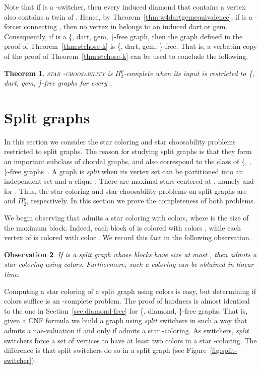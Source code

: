 \documentclass[a4paper, 11pt, oneside]{article}
\newtheorem{theorem}{Theorem}
\newtheorem{observation}[theorem]{Observation}
\newcommand{\stchose}[1]{\textsc{star -choosability}}
\newcommand{\ptwop}{\ensuremath{\Pi^p_2}\xspace}
\let\Definition=\emph
\begin{document}
Note that if  is a -switcher, then every induced diamond that contains a vertex  also contains a twin of .  Hence, by Theorem~\ref{thm:w4dartgemequivalence}, if  is a -forcer connecting , then no vertex in  belongs to an induced dart or gem.  Consequently, if  is a \{, dart, gem, \}-free graph, then the graph  defined in the proof of Theorem~\ref{thm:stchose-k} is \{, dart, gem, \}-free.  That is, a verbatim copy of the proof of Theorem~\ref{thm:stchose-k} can be used to conclude the following.

\begin{theorem}
  \stchose{k} is \ptwop-complete when its input is restricted to \{, dart, gem, \}-free graphs for every .
\end{theorem}

\section{Split graphs}
\label{sec:split}

In this section we consider the star coloring and star choosability problems restricted to split graphs.  The reason for studying split graphs is that they form an important subclass of chordal graphs, and also correspond to the class of \{, , \}-free graphs~\cite{Golumbic2004}.  A graph  is \Definition{split} when its vertex set can be partitioned into an independent set  and a clique .  There are  maximal stars centered at , namely  and  for .  Thus, the star coloring and star choosability problems on split graphs are \NP and \ptwop, respectively.  In this section we prove the completeness of both problems.

We begin observing that  admits a star coloring with  colors, where  is the size of the maximum block.  Indeed, each block  of  is colored with colors , while each vertex of  is colored with color .  We record this fact in the following observation.
\begin{observation}
 If  is a split graph whose blocks have size at most , then  admits a star coloring using  colors.  Furthermore, such a coloring can be obtained in linear time.
\end{observation}
Computing a star coloring of a split graph using  colors is easy, but determining if  colors suffice is an -complete problem.  The proof of hardness is almost identical to the one in Section~\ref{sec:diamond-free} for \{, diamond, \}-free graphs.  That is, given a CNF formula  we build a graph  using \emph{split} switchers in such a way that  admits a nae-valuation if and only if  admits a star -coloring.  As switchers, \Definition{split} switchers force a set of vertices to have at least two colors in a star -coloring.  The difference is that split switchers do so in a split graph (see Figure~\ref{fig:split-switcher}).
\end{document}
